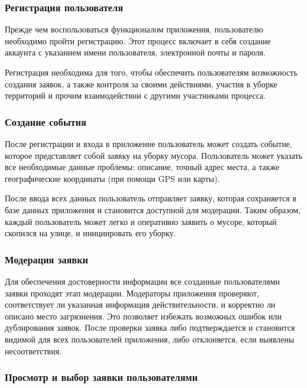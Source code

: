 \documentclass[diploma]{SCWorks}
\begin{document}
\subsubsection{Регистрация пользователя}

Прежде чем воспользоваться функционалом приложения, пользователю необходимо 
пройти регистрацию. Этот процесс включает в себя создание аккаунта с указанием 
имени пользователя, электронной почты и пароля. 

Регистрация необходима для того, чтобы обеспечить пользователям возможность 
создания заявок, а также контроля за своими действиями, участия в уборке 
территорий и прочим взаимодействии с другими участниками процесса.

\subsubsection{Создание события}

После регистрации и входа в приложение пользователь может создать событие, 
которое представляет собой заявку на уборку мусора. Пользователь может 
указать все необходимые данные проблемы: описание, точный адрес 
места, а также географические координаты (при помощи GPS или карты). 

После ввода всех данных пользователь отправляет заявку, которая сохраняется 
в базе данных приложения и становится доступной для модерации. Таким образом, 
каждый пользователь может легко и оперативно заявить о мусоре, который 
скопился на улице, и инициировать его уборку. 

\subsubsection{Модерация заявки}

Для обеспечения достоверности информации все созданные пользователями заявки 
проходят этап модерации. Модераторы приложения проверяют, соответствует ли 
указанная информация действительности, и корректно ли описано место 
загрязнения. Это позволяет избежать возможных ошибок или дублирования заявок. 
После проверки заявка либо подтверждается и становится видимой для 
всех пользователей приложения, либо отклоняется, если выявлены несоответствия.

\subsubsection{Просмотр и выбор заявки пользователями}
\end{document}
